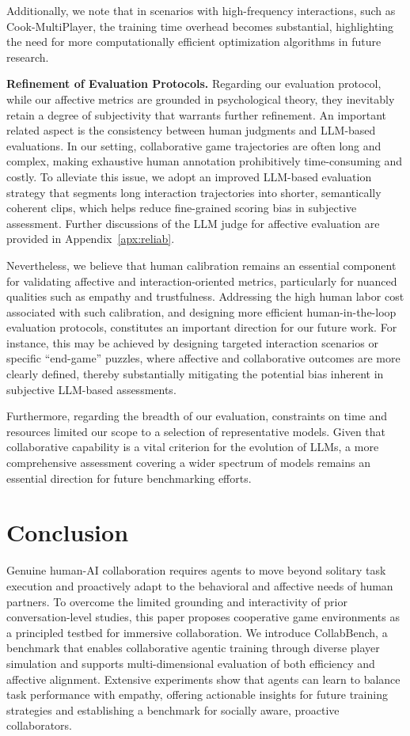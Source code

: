 \documentclass{article}
\theoremstyle{plain}
\theoremstyle{definition}
\theoremstyle{remark}
\begin{document}
Additionally, we note that in scenarios with high-frequency interactions, such as Cook-MultiPlayer, the training time overhead becomes substantial, highlighting the need for more computationally efficient optimization algorithms in future research.

\textbf{Refinement of Evaluation Protocols.} Regarding our evaluation protocol, while our affective metrics are grounded in psychological theory, they inevitably retain a degree of subjectivity that warrants further refinement. An important related aspect is the consistency between human judgments and LLM-based evaluations. In our setting, collaborative game trajectories are often long and complex, making exhaustive human annotation prohibitively time-consuming and costly. To alleviate this issue, we adopt an improved LLM-based evaluation strategy that segments long interaction trajectories into shorter, semantically coherent clips, which helps reduce fine-grained scoring bias in subjective assessment. Further discussions of the LLM judge for affective evaluation are provided in Appendix~\ref{apx:reliab}.

Nevertheless, we believe that human calibration remains an essential component for validating affective and interaction-oriented metrics, particularly for nuanced qualities such as empathy and trustfulness. Addressing the high human labor cost associated with such calibration, and designing more efficient human-in-the-loop evaluation protocols, constitutes an important direction for our future work. For instance, this may be achieved by designing targeted interaction scenarios or specific “end-game” puzzles, where affective and collaborative outcomes are more clearly defined, thereby substantially mitigating the potential bias inherent in subjective LLM-based assessments.

Furthermore, regarding the breadth of our evaluation, constraints on time and resources limited our scope to a selection of representative models. Given that collaborative capability is a vital criterion for the evolution of LLMs, a more comprehensive assessment covering a wider spectrum of models remains an essential direction for future benchmarking efforts.

\section{Conclusion}

Genuine human-AI collaboration requires agents to move beyond solitary task execution and proactively adapt to the behavioral and affective needs of human partners. To overcome the limited grounding and interactivity of prior conversation-level studies, this paper proposes cooperative game environments as a principled testbed for immersive collaboration. We introduce CollabBench, a benchmark that enables collaborative agentic training through diverse player simulation and supports multi-dimensional evaluation of both efficiency and affective alignment. Extensive experiments show that agents can learn to balance task performance with empathy, offering actionable insights for future training strategies and establishing a benchmark for socially aware, proactive collaborators.
\end{document}
